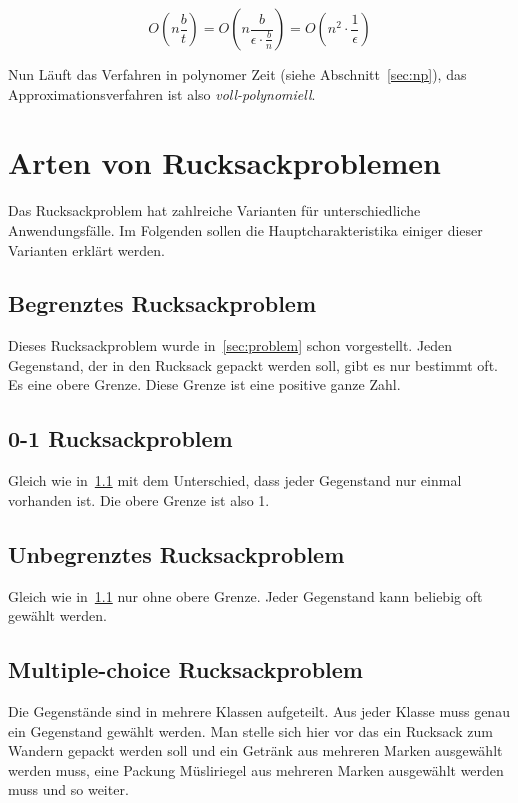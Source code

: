 \documentclass[12pt, a4paper, ngerman]{article}
\begin{document}
\[
  O(n\frac{b}{t})=O(n\frac{b}{\epsilon\cdot\frac{b}{n}})=O(n^2\cdot\frac{1}{\epsilon})
\]

Nun Läuft das Verfahren in polynomer Zeit (siehe Abschnitt~\ref{sec:np}),
das Approximationsverfahren ist also \emph{voll-polynomiell}.

\section{Arten von Rucksackproblemen}
Das Rucksackproblem hat zahlreiche Varianten für unterschiedliche Anwendungsfälle. 
Im Folgenden sollen die Hauptcharakteristika einiger dieser Varianten erklärt werden.

\subsection{Begrenztes Rucksackproblem}
\label{sec:bound_knapsack}

Dieses Rucksackproblem wurde in~\ref{sec:problem} schon vorgestellt.
Jeden Gegenstand, der in den Rucksack gepackt werden soll, gibt es nur bestimmt oft.
Es eine obere Grenze.
Diese Grenze ist eine positive ganze Zahl.

\subsection{0-1 Rucksackproblem}

Gleich wie in~\ref{sec:bound_knapsack} mit dem Unterschied,
dass jeder Gegenstand nur einmal vorhanden ist.
Die obere Grenze ist also 1.

\subsection{Unbegrenztes Rucksackproblem}

Gleich wie in~\ref{sec:bound_knapsack} nur ohne obere Grenze.
Jeder Gegenstand kann beliebig oft gewählt werden.

\subsection{Multiple-choice Rucksackproblem}

Die Gegenstände sind in mehrere Klassen aufgeteilt.
Aus jeder Klasse muss genau ein Gegenstand gewählt werden.
Man stelle sich hier vor das ein Rucksack zum Wandern gepackt werden soll
und ein Getränk aus mehreren Marken ausgewählt werden muss,
eine Packung Müsliriegel aus mehreren Marken ausgewählt werden muss und so weiter.
\end{document}
